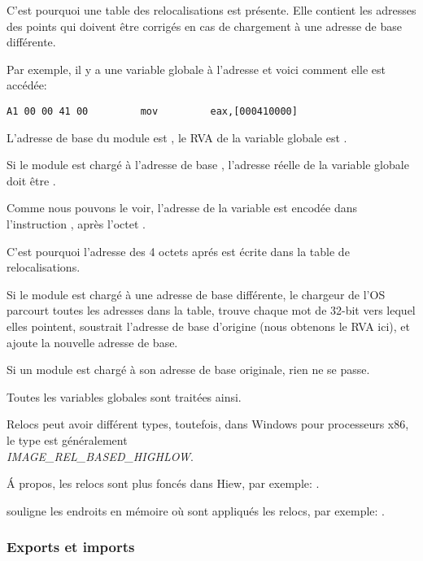 C'est pourquoi une table des relocalisations est présente.
Elle contient les adresses des points qui doivent être corrigés en cas de chargement
à une adresse de base différente.

Par exemple, il y a une variable globale à l'adresse  et voici comment
elle est accédée:

\begin{lstlisting}
A1 00 00 41 00         mov         eax,[000410000]
\end{lstlisting}

L'adresse de base du module est , le \ac{RVA} de la variable globale est
.

Si le module est chargé à l'adresse de base , l'adresse réelle de la
variable globale doit être .


Comme nous pouvons le voir, l'adresse de la variable est encodée dans l'instruction
, après l'octet .

C'est pourquoi l'adresse des 4 octets aprés  est écrite dans la table de
relocalisations.

Si le module est chargé à une adresse de base différente, le chargeur de l'\ac{OS}
parcourt toutes les adresses dans la table, trouve chaque mot de 32-bit vers lequel
elles pointent, soustrait l'adresse de base d'origine (nous obtenons le \ac{RVA} ici),
et ajoute la nouvelle adresse de base.

Si un module est chargé à son adresse de base originale, rien ne se passe.

Toutes les variables globales sont traitées ainsi.

Relocs peut avoir différent types, toutefois, dans Windows pour processeurs x86, le type est généralement \\
\emph{IMAGE\_REL\_BASED\_HIGHLOW}.

Á propos, les relocs sont plus foncés dans Hiew, par exemple: .

\myindex{\olly}
\olly souligne les endroits en mémoire où sont appliqués les relocs, par exemple:
.

\subsubsection{Exports et imports}

